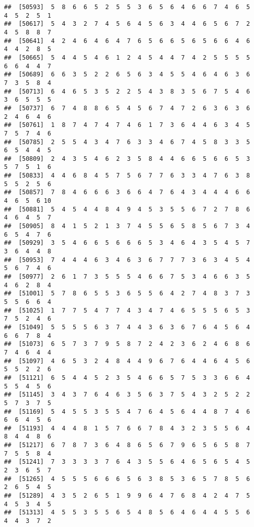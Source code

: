 \documentclass[
]{book}
\begin{document}
\begin{verbatim}
##  [50593]  5  8  6  6  5  2  5  5  3  6  5  6  4  6  6  7  4  6  5  4  5  2  5  1
##  [50617]  5  4  3  2  7  4  5  6  4  5  6  3  4  4  6  5  6  7  2  4  5  8  8  7
##  [50641]  4  2  4  6  4  6  4  7  6  5  6  6  5  6  5  6  6  4  6  4  4  2  8  5
##  [50665]  5  4  4  5  4  6  1  2  4  5  4  4  7  4  2  5  5  5  5  6  6  4  4  7
##  [50689]  6  6  3  5  2  2  6  5  6  3  4  5  5  4  6  4  6  3  6  7  3  5  8  4
##  [50713]  6  4  6  5  3  5  2  2  5  4  3  8  3  5  6  7  5  4  6  3  6  5  5  5
##  [50737]  6  7  4  8  8  6  5  4  5  6  7  4  7  2  6  3  6  3  6  2  4  6  4  6
##  [50761]  1  8  7  4  7  4  7  4  6  1  7  3  6  4  4  6  3  4  5  7  5  7  4  6
##  [50785]  2  5  5  4  3  4  7  6  3  3  4  6  7  4  5  8  3  3  5  6  5  4  4  5
##  [50809]  2  4  3  5  4  6  2  3  5  8  4  4  6  6  5  6  6  5  3  5  7  5  1  6
##  [50833]  4  4  6  8  4  5  7  5  6  7  7  6  3  3  4  7  6  3  8  5  5  2  5  6
##  [50857]  7  8  4  6  6  6  3  6  6  4  7  6  4  3  4  4  4  6  6  4  6  5  6 10
##  [50881]  5  4  5  4  4  8  4  9  4  5  3  5  5  6  7  2  7  8  6  4  6  4  5  7
##  [50905]  8  4  1  5  2  1  3  7  4  5  5  6  5  8  5  6  7  3  4  6  5  4  7  6
##  [50929]  3  5  4  6  6  5  6  6  6  5  3  4  6  4  3  5  4  5  7  3  6  4  4  8
##  [50953]  7  4  4  4  6  3  4  6  3  6  7  7  7  3  6  3  4  5  4  5  6  7  4  6
##  [50977]  2  6  1  7  3  5  5  5  4  6  6  7  5  3  4  6  6  3  5  4  6  2  8  4
##  [51001]  5  7  8  6  5  5  3  6  5  5  6  4  2  7  4  8  3  7  3  5  5  6  6  4
##  [51025]  1  7  7  5  4  7  7  4  3  4  7  4  6  5  5  5  6  5  3  7  5  2  4  6
##  [51049]  5  5  5  5  6  3  7  4  4  3  6  3  6  7  6  4  5  6  4  6  6  7  8  4
##  [51073]  6  5  7  3  7  9  5  8  7  2  4  2  3  6  2  4  6  8  6  7  4  6  4  4
##  [51097]  4  6  5  3  2  4  8  4  4  9  6  7  6  4  4  6  4  5  6  5  5  2  2  6
##  [51121]  6  5  4  4  5  2  3  5  4  6  6  5  7  5  3  3  6  6  4  5  5  4  5  6
##  [51145]  3  4  3  7  6  4  6  3  5  6  3  7  5  4  3  2  5  2  2  5  7  3  7  5
##  [51169]  5  4  5  5  3  5  5  4  7  6  4  5  6  4  4  8  7  4  6  6  6  4  5  6
##  [51193]  4  4  4  8  1  5  7  6  6  7  8  4  3  2  3  5  5  6  4  8  4  4  8  6
##  [51217]  6  7  8  7  3  6  4  8  6  5  6  7  9  6  5  6  5  8  7  7  5  5  8  4
##  [51241]  7  3  3  3  3  7  6  4  3  5  5  6  4  6  5  6  5  4  5  2  3  6  5  7
##  [51265]  4  5  5  5  6  6  6  5  6  3  8  5  3  6  5  7  8  5  6  2  6  5  4  5
##  [51289]  4  3  5  2  6  5  1  9  9  6  4  7  6  8  4  2  4  7  5  4  5  3  4  5
##  [51313]  4  5  5  3  5  5  6  5  4  8  5  6  4  6  4  4  5  5  6  4  4  3  7  2

\end{verbatim}
\end{document}
